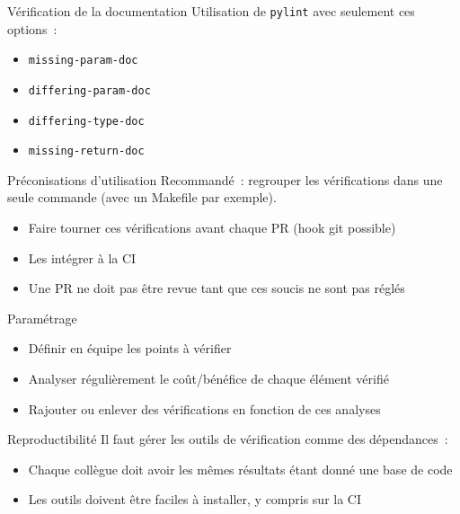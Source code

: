 \begin{frame}{Vérification de la documentation}
  Utilisation de \texttt{pylint} avec seulement ces options~:

  \begin{itemize}[<+->]
    \item \texttt{missing-param-doc}
    \item \texttt{differing-param-doc}
    \item \texttt{differing-type-doc}
    \item \texttt{missing-return-doc}
  \end{itemize}

\end{frame}

\begin{frame}{Préconisations d'utilisation}
  Recommandé~: regrouper les vérifications dans une seule commande (avec un Makefile par exemple).

  \begin{itemize}[<+->]
    \item Faire tourner ces vérifications avant chaque PR (hook git possible)
    \item Les intégrer à la CI
    \item \alert{Une PR ne doit pas être revue tant que ces soucis ne sont pas réglés}
  \end{itemize}
\end{frame}

\begin{frame}{Paramétrage}
  \begin{itemize}[<+->]
    \item Définir en équipe les points à vérifier
    \item Analyser régulièrement le coût/bénéfice de chaque élément vérifié
    \item Rajouter ou enlever des vérifications en fonction de ces analyses
  \end{itemize}
\end{frame}

\begin{frame}{Reproductibilité}
  Il faut gérer les outils de vérification comme des dépendances~:

  \begin{itemize}[<+->]
    \item Chaque collègue doit avoir les mêmes résultats étant donné une base de code
    \item Les outils doivent être faciles à installer, y compris sur la CI
  \end{itemize}

\end{frame}
